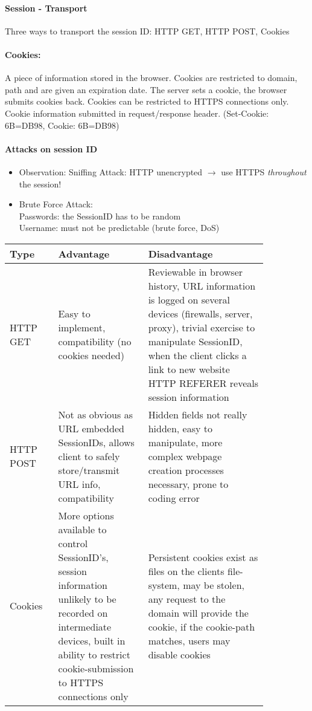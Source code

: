 \paragraph{Session - Transport} 
Three ways to transport the session ID: HTTP GET, HTTP POST, Cookies

\paragraph{Cookies:} A piece of information stored in the browser. Cookies are restricted to domain, path and are given an expiration date. The server sets a cookie, the browser submits cookies back. Cookies can be restricted to HTTPS connections only. Cookie information submitted in request/response header. (Set-Cookie: 6B=DB98, Cookie: 6B=DB98)

\paragraph{Attacks on session ID}
\begin{itemize}
\item Observation: Sniffing Attack: HTTP unencrypted $\to$ use HTTPS \emph{throughout} the session!
\item Brute Force Attack:\\ \quad Passwords: the SessionID has to be random \\ \quad Username: must not be predictable (brute force, DoS)
\end{itemize}

\begin{tabular}{p{0.15\linewidth}p{0.3\linewidth}p{0.4\linewidth}}
Type & Advantage & Disadvantage \\
\hline
\hline
HTTP GET & Easy to implement, compatibility (no cookies needed)  &  Reviewable in browser history, URL information is logged on several devices (firewalls, server, proxy), trivial exercise to manipulate SessionID, when the client clicks a link to new website HTTP REFERER reveals session information \\
\hline
HTTP POST & Not as obvious as URL embedded SessionIDs, allows client to safely store/transmit URL info, compatibility & Hidden fields not really hidden, easy to manipulate, more complex webpage creation processes necessary, prone to coding error \\
\hline
Cookies & More options available to control SessionID's, session information unlikely to be recorded on intermediate devices, built in ability to restrict cookie-submission to HTTPS connections only & Persistent cookies exist as files on the clients file-system, may be stolen, any request to the domain will provide the cookie, if the cookie-path matches, users may disable cookies \\
\end{tabular}

